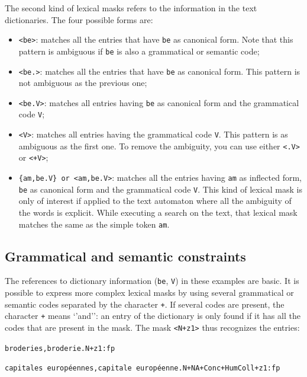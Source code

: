 The second kind of lexical masks refers to the information in the
text dictionaries.
 The four possible forms are:

\bigskip
\begin{itemize}
  \item \verb+<be>+: matches all the entries that have \verb+be+ as canonical
  form. Note that this pattern is ambiguous if \verb+be+ is also a grammatical
  or semantic code;
  \item \verb+<be.>+: matches all the entries that have \verb+be+ as canonical
  form. This pattern is not ambiguous as the previous one;
  \item \verb+<be.V>+: matches all entries having \verb+be+ as canonical form
  and the grammatical code \verb+V+;
  \item \verb+<V>+: matches all entries having the grammatical code \verb+V+.
  This pattern is as ambiguous as the first one. To remove the ambiguity, you
  can use either \verb+<.V>+ or \verb$<+V>$; 
  \item \verb+{am,be.V} or <am,be.V>+: matches all the entries having
  \verb+am+ as inflected form, \verb+be+ as canonical form and the
  grammatical code \verb+V+. This kind of lexical mask is only of interest if applied
  to the text automaton where all the ambiguity of the words is explicit.
   While executing a
  search on the text, that lexical mask matches the same as the simple token
  \verb+am+.
\end{itemize}

\subsection{Grammatical and semantic constraints}

The references to dictionary information (\verb+be+, \verb+V+) in these examples
are basic. It is possible to express more complex lexical masks by using
several grammatical or semantic codes separated by the character \verb$+$.
If several codes are present, the character \verb$+$ means `'and'':
 an entry of the dictionary is only found if it has all the codes that are
present in the mask. The mask \verb$<N+z1>$ thus recognizes the entries:

\bigskip
\noindent
\texttt{broderies,broderie.N+z1:fp}

\noindent
\texttt{capitales europ\'eennes,capitale europ\'eenne.N+NA+Conc+HumColl+z1:fp}

